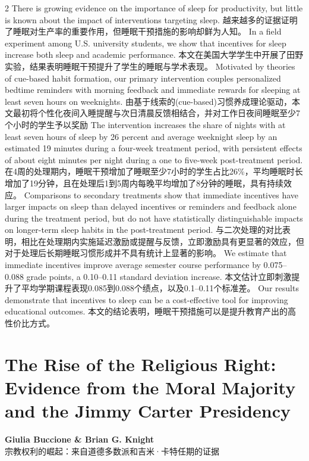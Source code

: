 \documentclass[cn,hazy,blue,14pt,screen]{elegantnote}
\begin{document}
\begin{paracol}{2}
	There is growing evidence on the importance of sleep for productivity, but little is known about the impact of interventions targeting sleep. 
	\switchcolumn
	越来越多的证据证明了睡眠对生产率的重要作用，但睡眠干预措施的影响却鲜为人知。
	\switchcolumn*
	In a field experiment among U.S. university students, we show that incentives for sleep increase both sleep and academic performance. 
	\switchcolumn
	本文在美国大学学生中开展了田野实验，结果表明睡眠干预提升了学生的睡眠与学术表现。
	\switchcolumn*
	Motivated by theories of cue-based habit formation, our primary intervention couples personalized bedtime reminders with morning feedback and immediate rewards for sleeping at least seven hours on weeknights. 
	\switchcolumn
	由基于线索的(cue-based)习惯养成理论驱动，本文最初将个性化夜间入睡提醒与次日清晨反馈相结合，并对工作日夜间睡眠至少7个小时的学生予以奖励
	\switchcolumn*
	The intervention increases the share of nights with at least seven hours of sleep by 26 percent and average weeknight sleep by an estimated 19 minutes during a four-week treatment period, with persistent effects of about eight minutes per night during a one to five-week post-treatment period.
	\switchcolumn
	在4周的处理期内，睡眠干预增加了睡眠至少7小时的学生占比26\%，平均睡眠时长增加了19分钟，且在处理后1到5周内每晚平均增加了8分钟的睡眠，具有持续效应。
	\switchcolumn*
	Comparisons to secondary treatments show that immediate incentives have larger impacts on sleep than delayed incentives or reminders and feedback alone during the treatment period, but do not have statistically distinguishable impacts on longer-term sleep habits in the post-treatment period. 
	\switchcolumn
	与二次处理的对比表明，相比在处理期内实施延迟激励或提醒与反馈，立即激励具有更显著的效应，但对于处理后长期睡眠习惯形成并不具有统计上显著的影响。
	\switchcolumn*
	We estimate that immediate incentives improve average semester course performance by 0.075--0.088 grade points, a 0.10--0.11 standard deviation increase. 
	\switchcolumn
	本文估计立即刺激提升了平均学期课程表现0.085到0.088个绩点，以及0.1--0.11个标准差。
	\switchcolumn*
	Our results demonstrate that incentives to sleep can be a cost-effective tool for improving educational outcomes.
	本文的结论表明，睡眠干预措施可以是提升教育产出的高性价比方式。
\end{paracol}

\section{The Rise of the Religious Right: Evidence from the Moral Majority and the Jimmy Carter Presidency}
\begin{center}
	\textbf{Giulia Buccione \& Brian G. Knight}\\
	宗教权利的崛起：来自道德多数派和吉米·卡特任期的证据
\end{center}
\end{document}
